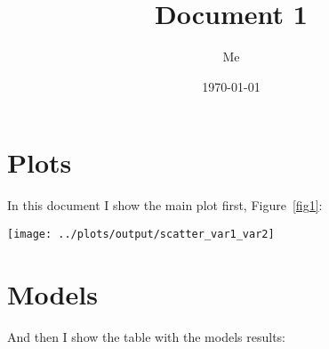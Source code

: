 \documentclass[notitlepage]{article}
\title{Document 1}
\author{Me}
\date{\today}
\begin{document}
\maketitle

\clearpage
\section{Plots}

In this document I show the main plot first, Figure~\ref{fig1}:

\begin{figure*}[htb!]
  \centering

  \texttt{[image: ../plots/output/scatter\_var1\_var2]}

  \caption{Scatter plot}\label{fig1}
\end{figure*}

\clearpage
\section{Models}

And then I show the table with the models results:


\end{document}
